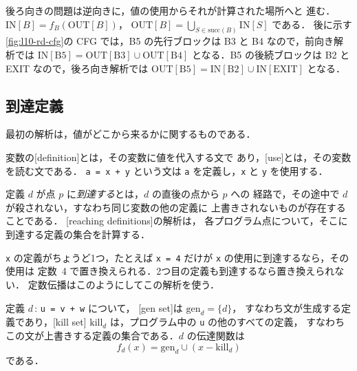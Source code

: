 \documentclass[../main.tex]{subfiles}
\begin{document}
後ろ向きの問題は逆向きに，値の使用からそれが計算された場所へと
進む．$\mathrm{IN}[B]=f_B(\mathrm{OUT}[B])$，
$\mathrm{OUT}[B]=\bigcup_{S\in\mathrm{succ}(B)}\mathrm{IN}[S]$
である．
後に示す\cref{fig:l10-rd-cfg}の CFG では，B5 の先行ブロックは B3 と
B4 なので，前向き解析では
$\mathrm{IN}[\mathrm{B5}]=\mathrm{OUT}[\mathrm{B3}]\cup\mathrm{OUT}[\mathrm{B4}]$
となる．B5 の後続ブロックは B2 と EXIT なので，後ろ向き解析では
$\mathrm{OUT}[\mathrm{B5}]=\mathrm{IN}[\mathrm{B2}]\cup\mathrm{IN}[\mathrm{EXIT}]$
となる．

\subsection{到達定義}

最初の解析は，値がどこから来るかに関するものである．

\begin{definition}[定義，使用]
  変数の[definition]とは，その変数に値を代入する文で
  あり，[use]とは，その変数を読む文である．
  \texttt{a = x + y} という文は \texttt{a} を定義し，\texttt{x} と
  \texttt{y} を使用する．
\end{definition}

\begin{definition}[到達定義]
  定義 $d$ が点 $p$ に\emph{到達する}とは，$d$ の直後の点から $p$ への
  経路で，その途中で $d$ が殺されない，すなわち同じ変数の他の定義に
  上書きされないものが存在することである．
  [reaching definitions]の解析は，
  各プログラム点について，そこに到達する定義の集合を計算する．
\end{definition}

\texttt{x} の定義がちょうど1つ，たとえば
\texttt{x = 4} だけが \texttt{x} の使用に到達するなら，その使用は
定数~4 で置き換えられる．2つ目の定義も到達するなら置き換えられない．
定数伝播はこのようにしてこの解析を使う．

\begin{definition}
  定義 $d$\,: \texttt{u = v + w} について，
  [gen set]は $\mathrm{gen}_d=\{d\}$，
  すなわち文が生成する定義であり，[kill set]
  $\mathrm{kill}_d$ は，プログラム中の \texttt{u} の他のすべての定義，
  すなわちこの文が上書きする定義の集合である．$d$ の伝達関数は
  \begin{equation}
    \label{eq:l10-fd}
    f_d(x) = \mathrm{gen}_d \cup (x - \mathrm{kill}_d)
  \end{equation}
  である．
\end{definition}
\end{document}
